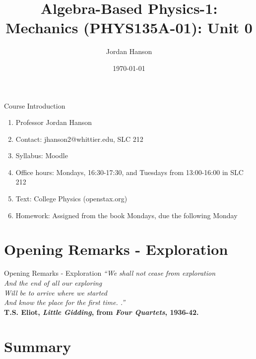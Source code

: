 \documentclass{beamer}
\title{Algebra-Based Physics-1: Mechanics (PHYS135A-01): Unit 0}
\date{\today}
\author{Jordan Hanson}
\institute{Whittier College Department of Physics and Astronomy}
\begin{document}
\maketitle

\begin{frame}{Course Introduction}
\begin{enumerate}
\item Professor Jordan Hanson
\item Contact: jhanson2@whittier.edu, SLC 212
\item Syllabus: Moodle
\item Office hours: Mondays, 16:30-17:30, and Tuesdays from 13:00-16:00 in SLC 212
\item Text: College Physics (openstax.org)
\item Homework: Assigned from the book Mondays, due the following Monday
\end{enumerate}
\end{frame}

\section{Opening Remarks - Exploration}

\begin{frame}{Opening Remarks - Exploration}
\textit{``We shall not cease from exploration \\
And the end of all our exploring \\
Will be to arrive where we started \\
And know the place for the first time. .''} \\  \vspace{1cm} \textbf{T.S. Eliot, \textit{Little Gidding}, from  \textit{Four Quartets}, 1936-42.}
\end{frame}

\section{Summary}
\end{document}
